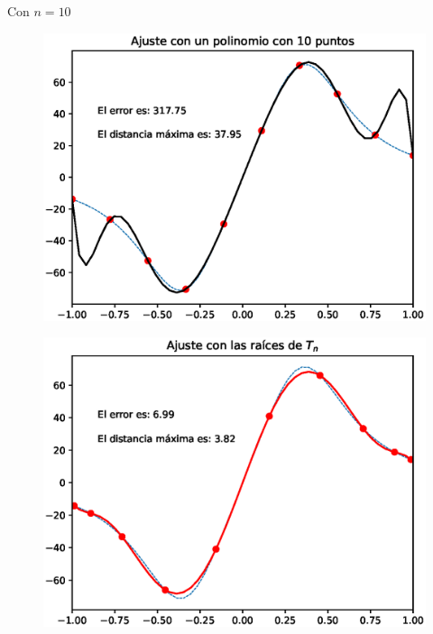 \documentclass[12pt]{article}
\numberwithin{equation}{section}
\begin{document}
\newpage
Con $n = 10$
\\
\begin{minipage}{0.45\linewidth}
    \begin{figure}[H]
    \centering
    \includegraphics[scale=0.44]{Imagenes/Interpolacion_Chebychev_10_Polinomio.eps}
    \end{figure}       
\end{minipage}
\hspace{0.1cm}
\begin{minipage}{0.45\linewidth}
\begin{figure}[H]
    \centering
    \includegraphics[scale=0.44]{Imagenes/Interpolacion_Chebychev_10_Raices.eps}
\end{figure}
\end{minipage}
\end{document}

